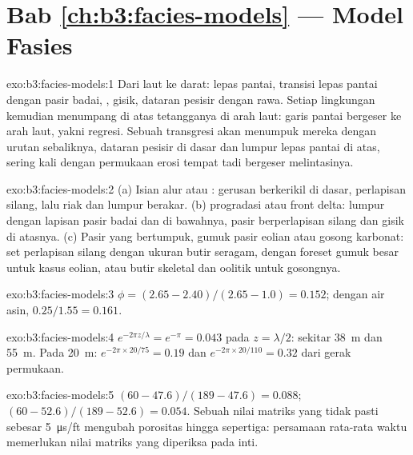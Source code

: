 \section*{Bab \ref{ch:b3:facies-models} --- Model Fasies}

\begin{solution}{exo:b3:facies-models:1}
Dari laut ke darat: lepas pantai, transisi lepas pantai dengan pasir badai,
, gisik, dataran pesisir dengan rawa. Setiap lingkungan kemudian
menumpang di atas tetangganya di arah laut: garis pantai bergeser ke arah laut, yakni regresi. Sebuah
transgresi akan menumpuk mereka dengan urutan sebaliknya, dataran pesisir di
dasar dan lumpur lepas pantai di atas, sering kali dengan permukaan erosi tempat
 tadi bergeser melintasinya.
\end{solution}

\begin{solution}{exo:b3:facies-models:2}
(a) Isian alur atau : gerusan berkerikil di dasar, perlapisan silang,
lalu riak dan lumpur berakar. (b)  progradasi atau front delta:
lumpur dengan lapisan pasir badai dan  di bawahnya,
pasir  berperlapisan silang dan gisik di atasnya. (c) Pasir  yang bertumpuk,
gumuk pasir eolian atau gosong karbonat: set perlapisan silang dengan ukuran butir
seragam, dengan foreset gumuk besar untuk kasus eolian, atau butir skeletal dan oolitik
untuk gosongnya.
\end{solution}

\begin{solution}{exo:b3:facies-models:3}
$\phi = (2.65 - 2.40)/(2.65 - 1.0) = 0.152$; dengan air asin,
$0.25/1.55 = 0.161$.
\end{solution}

\begin{solution}{exo:b3:facies-models:4}
$e^{-2\pi z/\lambda} = e^{-\pi} = 0.043$ pada $z = \lambda/2$: sekitar
\qty{38}{m} dan \qty{55}{m}. Pada \qty{20}{m}: $e^{-2\pi\times20/75} = 0.19$
dan $e^{-2\pi\times20/110} = 0.32$ dari gerak permukaan.
\end{solution}

\begin{solution}{exo:b3:facies-models:5}
$(60 - 47.6)/(189 - 47.6) = 0.088$; $(60 - 52.6)/(189 - 52.6) = 0.054$. Sebuah nilai matriks
yang tidak pasti sebesar \qty{5}{\micro\second/ft} mengubah porositas
hingga sepertiga: persamaan rata-rata waktu memerlukan nilai matriks yang diperiksa pada inti.
\end{solution}

